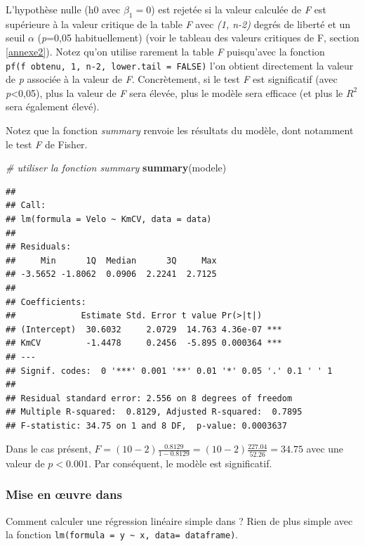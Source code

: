 \documentclass[
  11pt,
  french,
]{book}
\makeatletter
\newenvironment{Shaded}{\begin{snugshade}}{\end{snugshade}}
\newcommand{\CommentTok}[1]{\textcolor[rgb]{0.56,0.35,0.01}{\textit{#1}}}
\newcommand{\KeywordTok}[1]{\textcolor[rgb]{0.13,0.29,0.53}{\textbf{#1}}}
\newcommand{\NormalTok}[1]{#1}
\newenvironment{kframe}{%
\medskip{}
\setlength{\fboxsep}{.8em}
 \def\at@end@of@kframe{}%
 \ifinner\ifhmode%
  \def\at@end@of@kframe{\end{minipage}}%
  \begin{minipage}{\columnwidth}%
 \fi\fi%
 \def\FrameCommand##1{\hskip\@totalleftmargin \hskip-\fboxsep
 \colorbox{shadecolor}{##1}\hskip-\fboxsep
     \hskip-\linewidth \hskip-\@totalleftmargin \hskip\columnwidth}%
 \MakeFramed {\advance\hsize-\width
   \@totalleftmargin\z@ \linewidth\hsize
   \@setminipage}}%
 {\par\unskip\endMakeFramed%
 \at@end@of@kframe}
\renewenvironment{Shaded}{\begin{kframe}}{\end{kframe}}
\makeatother
\begin{document}
L'hypothèse nulle (h0 avec \(\beta_1=0\)) est rejetée si la valeur calculée de \emph{F} est supérieure à la valeur critique de la table \emph{F} avec \emph{(1, n-2)} degrés de liberté et un seuil \(\alpha\) (\emph{p}=0,05 habituellement) (voir le tableau des valeurs critiques de F, section \ref{annexe2}). Notez qu'on utilise rarement la table \emph{F} puisqu'avec la fonction \texttt{pf(f\ obtenu,\ 1,\ n-2,\ lower.tail\ =\ FALSE)} l'on obtient directement la valeur de \emph{p} associée à la valeur de \emph{F}. Concrètement, si le test \emph{F} est significatif (avec \emph{p}\textless0,05), plus la valeur de \emph{F} sera élevée, plus le modèle sera efficace (et plus le \(R^2\) sera également élevé).

Notez que la fonction \emph{summary} renvoie les résultats du modèle, dont notamment le test \emph{F} de Fisher.

\begin{Shaded}
\begin{Highlighting}[]
\CommentTok{# utiliser la fonction summary}
\KeywordTok{summary}\NormalTok{(modele)}
\end{Highlighting}
\end{Shaded}

\begin{verbatim}
## 
## Call:
## lm(formula = Velo ~ KmCV, data = data)
## 
## Residuals:
##     Min      1Q  Median      3Q     Max 
## -3.5652 -1.8062  0.0906  2.2241  2.7125 
## 
## Coefficients:
##             Estimate Std. Error t value Pr(>|t|)    
## (Intercept)  30.6032     2.0729  14.763 4.36e-07 ***
## KmCV         -1.4478     0.2456  -5.895 0.000364 ***
## ---
## Signif. codes:  0 '***' 0.001 '**' 0.01 '*' 0.05 '.' 0.1 ' ' 1
## 
## Residual standard error: 2.556 on 8 degrees of freedom
## Multiple R-squared:  0.8129,	Adjusted R-squared:  0.7895 
## F-statistic: 34.75 on 1 and 8 DF,  p-value: 0.0003637
\end{verbatim}

Dans le cas présent, \(F = (10 - 2)\frac{0.8129}{1-0.8129} = (10-2)\frac{227.04}{52.26} = 34.75\) avec une valeur de \(p < 0.001\). Par conséquent, le modèle est significatif.

\hypertarget{sect04144}{%
\subsubsection{Mise en œuvre dans}\label{sect04144}}

Comment calculer une régression linéaire simple dans ? Rien de plus simple avec la fonction \texttt{lm(formula\ =\ y\ \textasciitilde{}\ x,\ data=\ dataframe)}.
\end{document}
